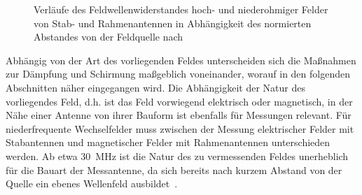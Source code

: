 \begin{figure}[ht]
    \centering
    \caption[Verläufe des Feldwellenwiderstandes hoch- und niederohmiger Felder von Stab- und Rahmenantennen in Abhängigkeit des normierten Abstandes von der Feldquelle]{Verläufe des Feldwellenwiderstandes hoch- und niederohmiger Felder von Stab- und Rahmenantennen in Abhängigkeit des normierten Abstandes von der Feldquelle nach~\cite{EMV}}
    \label{fig:2_Feldwellenwiderstand}
\end{figure}


Abhängig von der Art des vorliegenden Feldes unterscheiden sich die Maßnahmen zur Dämpfung und Schirmung maßgeblich voneinander, worauf in den folgenden Abschnitten näher eingegangen wird. Die Abhängigkeit der Natur des vorliegendes Feld, d.h. ist das Feld vorwiegend elektrisch oder magnetisch, in der Nähe einer Antenne von ihrer Bauform ist ebenfalls für Messungen relevant. Für niederfrequente Wechselfelder muss zwischen der Messung elektrischer Felder mit Stabantennen und magnetischer Felder mit Rahmenantennen unterschieden werden. Ab etwa \SI{30}{\mega\hertz} ist die Natur des zu vermessenden Feldes unerheblich für die Bauart der Messantenne, da sich bereits nach kurzem Abstand von der Quelle ein ebenes Wellenfeld ausbildet~\cite{Design_of_shielded_enclosures}.



